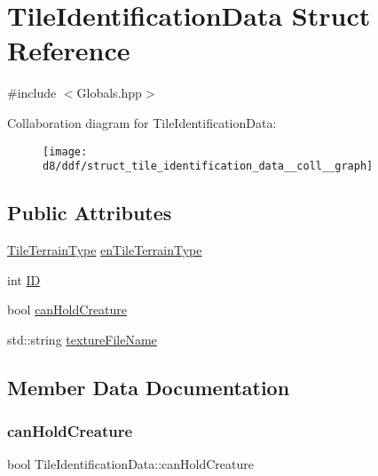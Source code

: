 \hypertarget{struct_tile_identification_data}{}\section{Tile\+Identification\+Data Struct Reference}
\label{struct_tile_identification_data}


{\ttfamily \#include $<$Globals.\+hpp$>$}



Collaboration diagram for Tile\+Identification\+Data\+:\nopagebreak
\begin{figure}[H]
\begin{center}
\leavevmode
\texttt{[image: d8/ddf/struct\_tile\_identification\_data\_\_coll\_\_graph]}
\end{center}
\end{figure}
\subsection*{Public Attributes}
\begin{DoxyCompactItemize}
\item 
\mbox{\hyperlink{_enum_types_8hpp_a462b3f8c270b48544fc9c2e167a3f6e5}{Tile\+Terrain\+Type}} \mbox{\hyperlink{struct_tile_identification_data_a966505adf98464160d947a95818a8d36}{en\+Tile\+Terrain\+Type}}
\item 
int \mbox{\hyperlink{struct_tile_identification_data_af8dc97a27969926817e80d13d3d6c7b9}{ID}}
\item 
bool \mbox{\hyperlink{struct_tile_identification_data_abcd7c3d9a113b5108a51b6e25527d630}{can\+Hold\+Creature}}
\item 
std\+::string \mbox{\hyperlink{struct_tile_identification_data_a4b60c03f60c758ffabdcfd90c183d2b3}{texture\+File\+Name}}
\end{DoxyCompactItemize}


\subsection{Member Data Documentation}
\mbox{\label{struct_tile_identification_data_abcd7c3d9a113b5108a51b6e25527d630}} 
\subsubsection{\texorpdfstring{can\+Hold\+Creature}{canHoldCreature}}
{\footnotesize\ttfamily bool Tile\+Identification\+Data\+::can\+Hold\+Creature}

